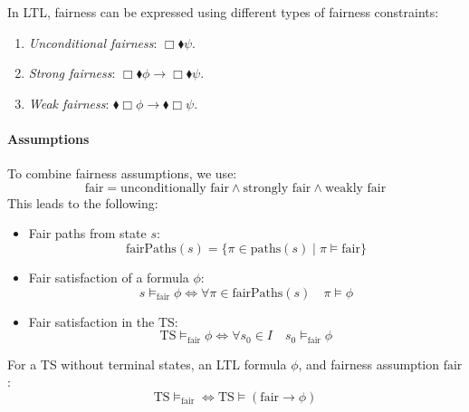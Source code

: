 In LTL, fairness can be expressed using different types of fairness constraints:
\begin{enumerate}
    \item \textit{Unconditional fairness}: $\Box\blacklozenge\psi$. 
    \item \textit{Strong fairness}: $\Box\blacklozenge\phi\rightarrow\Box\blacklozenge\psi$.
    \item \textit{Weak fairness}: $\blacklozenge\Box\phi\rightarrow\blacklozenge\Box\psi$.
\end{enumerate}

\paragraph*{Assumptions}
To combine fairness assumptions, we use:
\[\text{fair}=\text{unconditionally fair}\land\text{strongly fair}\land\text{weakly fair}\]
\noindent This leads to the following:
\begin{itemize}
    \item Fair paths from state $s$: 
        \[\text{fairPaths}(s)=\{\pi\in\text{paths}(s)\mid\pi\models\text{fair}\}\]
    \item Fair satisfaction of a formula $\phi$: 
        \[s\models_{\text{fair}}\phi\Leftrightarrow\forall\pi\in\text{fairPaths}(s)\quad\pi\models\phi\]
    \item Fair satisfaction in the TS: 
        \[\text{TS}\models_{\text{fair}}\phi\Leftrightarrow\forall s_0\in I\quad s_0\models_{\text{fair}}\phi\]
\end{itemize}
\begin{theorem}
    For a TS without terminal states, an LTL formula $\phi$, and fairness assumption $\text{fair}$: 
    \[\text{TS}\models_{\text{fair}}\Leftrightarrow\text{TS}\models(\text{fair}\rightarrow\phi)\]
\end{theorem}

